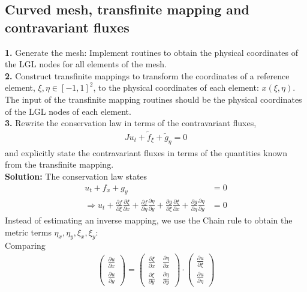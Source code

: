 \documentclass[11pt]{scrartcl}
\begin{document}
\subsection{Curved mesh, transfinite mapping and contravariant fluxes}
\textbf{1.} Generate the mesh: Implement routines to obtain the physical coordinates of the LGL nodes for all elements of the mesh.\\
\textbf{2.} Construct transfinite mappings to transform the coordinates of a reference element, $ \xi, \eta \in [-1, 1]^2$, to the physical coordinates of each element: $x(\xi,\eta)$. The input of the transfinite mapping routines should be the physical coordinates of the LGL nodes of each element.\\
\textbf{3.} Rewrite the conservation law in terms of the contravariant fluxes,
\begin{align*}
  J u_t + \tilde{f}_\xi +\tilde{g}_\eta =0
\end{align*}
and explicitly state the contravariant fluxes in terms of the quantities known from the transfinite mapping. \\
\textbf{Solution:}
The conservation law states 
\begin{align}
 u_t + f_x +g_y &= 0 \\
 \Rightarrow  u_t + \frac{\partial f}{\partial\xi} \frac{\partial\xi}{\partial x}+\frac{\partial f}{\partial \eta} \frac{\partial \eta}{\partial y} + \frac{\partial g}{\partial\xi} \frac{\partial\xi}{\partial x}+\frac{\partial g}{\partial\eta} \frac{\partial\eta}{\partial y} &= 0
\label{contravariant1}
\end{align}
Instead of estimating an inverse mapping, we use the Chain rule to obtain the metric terms $\eta_x, \eta_y, \xi_x, \xi_y$:\\
Comparing
\begin{align*}
\begin{pmatrix}
\frac{\partial u}{\partial x} \\
\frac{\partial u}{\partial y}
\end{pmatrix} =
\begin{pmatrix}
\frac{\partial \xi}{\partial x} & \frac{\partial \eta}{\partial x}\\
\frac{\partial \xi}{\partial y} & \frac{\partial \eta}{\partial y}
\end{pmatrix} \cdot
\begin{pmatrix}
\frac{\partial u}{\partial \xi} \\
\frac{\partial u}{\partial \eta}
\end{pmatrix}
\end{align*}
\end{document}
